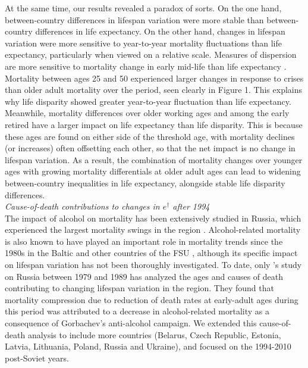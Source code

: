 \documentclass{article}
\begin{document}
\begin{spacing}{1.5}
At the same time, our results revealed a paradox of sorts. On the one hand, between-country differences in lifespan variation were more stable than between-country differences in life expectancy. On the other hand, changes in lifespan variation were more sensitive to year-to-year mortality fluctuations than life expectancy, particularly when viewed on a relative scale. Measures of dispersion are more sensitive to mortality change in early mid-life than life expectancy \citep{vanraalte2013}. Mortality between ages 25 and 50 experienced larger changes in response to crises than older adult mortality over the period, seen clearly in Figure 1. This explains why life disparity showed greater year-to-year fluctuation than life expectancy. Meanwhile, mortality differences over older working ages and among the early retired have a larger impact on life expectancy than life disparity. This is because these ages are found on either side of the threshold age, with mortality declines (or increases) often offsetting each other, so that the net impact is no change in lifespan variation. As a result, the combination of mortality changes over younger ages with growing mortality differentials at older adult ages can lead to widening between-country inequalities in life expectancy, alongside stable life disparity differences.
\\

\emph{Cause-of-death contributions to changes in $e^\dagger$ after 1994}\\

The impact of alcohol on mortality has been extensively studied in Russia, which experienced the largest mortality swings in the region \citep{leon1997huge,rehm2007, shkolnikov2013components,shkolnikov2001}. Alcohol-related mortality is also known to have played an important role in mortality trends since the 1980s in the Baltic and other countries of the FSU \citep{rehm2007,jasilionis2011}, 
although its specific impact on lifespan variation has not been thoroughly investigated. To date, only \citet{shkolnikov2003}'s study on Russia between 1979 and 1989 has analyzed the ages and causes of death contributing to changing lifespan variation in the region. They found that mortality compression due to reduction of death rates at early-adult ages during this period was attributed to a decrease in alcohol-related mortality as a consequence of Gorbachev's anti-alcohol campaign. We extended this cause-of-death analysis to include more countries (Belarus, Czech Republic, Estonia, Latvia, Lithuania, Poland, Russia and Ukraine), and focused on the 1994-2010 post-Soviet years.\\


\end{spacing}
\end{document}
